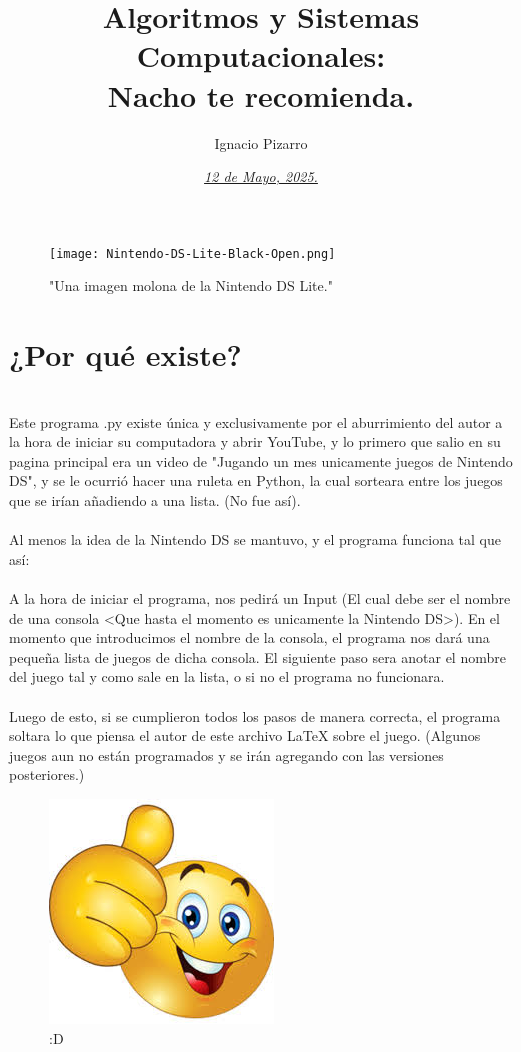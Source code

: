 \documentclass[7pt]{article}
\title{\textbf{Algoritmos y Sistemas Computacionales: \\ Nacho te recomienda.}}
\author{Ignacio Pizarro}
\date{\textit{\underline{12 de Mayo, 2025.}}}
\begin{document}
\maketitle

\begin{figure}[H]
    \centering
    \texttt{[image: Nintendo-DS-Lite-Black-Open.png]}
    \caption{"Una imagen molona de la Nintendo DS Lite."}
\end{figure}

\newpage


\Large\section{\textbf{¿Por qué existe?}}
\hfill
\hfill
\\

Este programa .py existe única y exclusivamente por el aburrimiento del autor a la hora de iniciar su computadora y abrir YouTube, y lo primero que salio en su pagina principal era un video de "Jugando un mes unicamente juegos de Nintendo DS", y se le ocurrió hacer una ruleta en Python, la cual sorteara entre los juegos que se irían añadiendo a una lista. (No fue así).
\\
\\
Al menos la idea de la Nintendo DS se mantuvo, y el programa funciona tal que así:
\\
\\
A la hora de iniciar el programa, nos pedirá un Input (El cual debe ser el nombre de una consola <Que hasta el momento es unicamente la Nintendo DS>). En el momento que introducimos el nombre de la consola, el programa nos dará una pequeña lista de juegos de dicha consola. El siguiente paso sera anotar el nombre del juego tal y como sale en la lista, o si no el programa no funcionara.\\
\\
Luego de esto, si se cumplieron todos los pasos de manera correcta, el programa soltara lo que piensa el autor de este archivo LaTeX sobre el juego. (Algunos juegos aun no están  programados y se irán agregando con las versiones posteriores.)
\newline
\newline


\begin{figure}
    \centering
    \includegraphics[width=0.1\linewidth]{images.png}
    \caption{:D}
    \label{fig:enter-label}
\end{figure}
\end{document}
